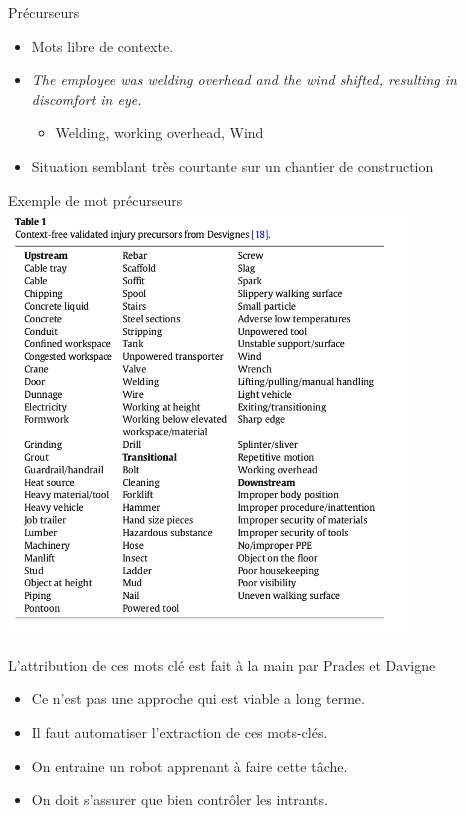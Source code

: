 \begin{frame}
	Précurseurs
	\begin{itemize}
		\item Mots libre de contexte.
		\item \textit{The employee was welding overhead and the wind shifted, resulting in discomfort in eye.}\\
		\begin{itemize}
			\item Welding, working overhead, Wind
		\end{itemize}
		
	
		\item Situation semblant très courtante sur un chantier de construction
	\end{itemize}	

		
\end{frame}


\begin{frame}
	Exemple de mot précurseurs\\
	
	\includegraphics[width=\paperwidth]{table_precurseurs}
\end{frame}


\begin{frame}	
	L'attribution de ces mots clé est fait à la main par Prades et Davigne
	\begin{itemize}
		\item Ce n'est pas une approche qui est viable a long terme.		
		\item Il faut automatiser l'extraction de ces mots-clés.		
		\item On entraine un robot apprenant à faire cette tâche.
		\item On doit s'assurer que bien contrôler les intrants.
	\end{itemize}
\end{frame}



